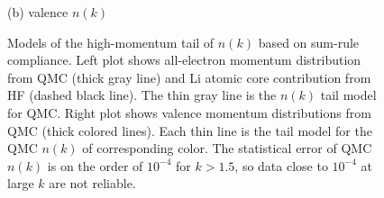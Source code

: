 \documentclass[aps,prl,superscriptaddress]{revtex4-1}
\begin{document}
\begin{figure}[h]
\begin{minipage}{0.49\linewidth}
(b) valence $n(k)$
\end{minipage}
\caption{Models of the high-momentum tail of $n(k)$ based on sum-rule compliance. Left plot shows all-electron momentum distribution from QMC (thick gray line) and Li atomic core contribution from HF (dashed black line). The thin gray line is the $n(k)$ tail model for QMC. Right plot shows valence momentum distributions from QMC (thick colored lines). Each thin line is the tail model for the QMC $n(k)$ of corresponding color. The statistical error of QMC $n(k)$ is on the order of $10^{-4}$ for $k>1.5$, so data close to $10^{-4}$ at large $k$ are not reliable.}
\label{fig:qmc-tail-model}
\end{figure}



\end{document}
